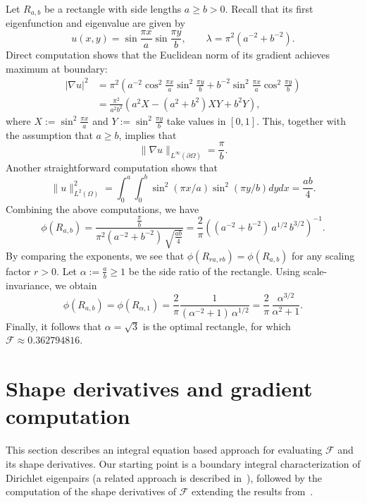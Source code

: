 \documentclass{amsart}
\theoremstyle{plain}
\begin{document}
Let $R_{a,b}$ be a rectangle with side lengths $a\geq b>0$. Recall that its first eigenfunction and eigenvalue are given by
    \[u(x,y) = \sin\frac{\pi x}{a}\sin\frac{\pi y}{b},
    \quad\quad \lambda = \pi^2(a^{-2}+b^{-2}).\]
Direct computation shows that the Euclidean norm of its gradient achieves maximum at boundary:
\begin{equation}
  \begin{aligned}
  |\nabla u|^2
  &= \pi^2\left(a^{-2}\cos^2\frac{\pi x}{a}\sin^2\frac{\pi y}{b} + b^{-2}\sin^2\frac{\pi x}{a}\cos^2\frac{\pi y}{b}\right)\\
  &= \frac{\pi^2}{a^2b^2}\left(a^2X-(a^2+b^2)XY+b^2Y \right),
  \end{aligned}
  \end{equation}
where $X:=\sin^2\frac{\pi x}{a}$ and $Y:=\sin^2\frac{\pi y}{b}$ take values in $[0,1]$. This, together with the assumption that $a\geq b$, implies that
  \[\|\nabla u\|_{L^\infty(\partial\Omega)} = \frac{\pi}{b}.\]
Another straightforward computation shows that
  \[\|u\|_{L^2(\Omega)}^2
    = \int_0^a\int_0^b\sin^2(\pi x/a)\sin^2(\pi y/b)dydx
    = \frac{ab}{4}.
    \]
Combining the above computations, we have
  \[\phi(R_{a,b}) 
  = \frac{\frac{\pi}{b}}{\pi^2(a^{-2}+b^{-2})\,\sqrt{\frac{ab}{4}}}
  = \frac{2}{\pi}\left((a^{-2}+b^{-2})\, a^{1/2}\,b^{3/2}\right)^{-1}.\]
	By comparing the exponents, we see that $\phi(R_{ra,rb}) = \phi(R_{a,b})$ for any scaling factor $r>0$. Let $\alpha := \frac{a}{b}\geq 1$ be the side ratio of the rectangle. Using scale-invariance, we obtain
	  \[\phi(R_{a,b}) = \phi(R_{\alpha, 1})
	  = \frac{2}{\pi}\frac{1}{(\alpha^{-2}+1)\,\alpha^{1/2}}
	  = \frac{2}{\pi}\,\frac{\alpha^{3/2}}{\alpha^2+1}.\]
	  Finally, it follows that $\alpha = \sqrt{3}$ is the optimal rectangle, for which $\mathcal{F} \approx 0.362794816$.

\section{Shape derivatives and gradient computation}
\label{sec:gradients}

This section describes an integral equation based approach for evaluating $\mathcal{F}$ and its shape derivatives.  Our starting point is a boundary integral characterization of Dirichlet eigenpairs (a related approach is described in~\cite{zhao2015robust}), followed by the computation of the shape derivatives of $\mathcal{F}$ extending the results from~\cite{potthast1994frechet,hohage1998newton}.
\end{document}
